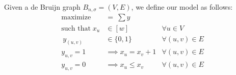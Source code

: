 \documentclass{article}
\begin{document}
Given a de Bruijn graph $B_{n, \sigma}=(V,E)$, we define our model as follows:
\begin{align}
    \text{maximize} &=~ \sum y~ \\
     \text{such that}\;x_u &\in [w] & \forall u\in V \\\
    y_{(u,v)} &\in \{0, 1\} & \forall (u,v)\in E \\
   y_{u,v} = 1 & \implies  x_u = x_v + 1   &\forall (u,v)\in E\\
   y_{u,v} = 0 & \implies  x_u \leq x_v    &\forall (u,v)\in E
\end{align}


%
\end{document}
